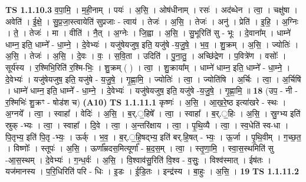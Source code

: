 \documentclass[17pt]{extarticle}
\begin{document}
                  \newline
                                \textbf{ TS 1.1.10.3} \newline
                  व॒पा॒मि॒ । म॒ही॒नाम् । पयः॑ । अ॒सि॒ । ओष॑धीनाम् । रसः॑ । अद॑ब्धेन । त्वा॒ । चक्षु॑षा । अवेति॑ । ई॒क्षे॒ । सु॒प्र॒जा॒स्त्वायेति॑ सुप्रजाः - त्वाय॑ । तेजः॑ । अ॒सि॒ । तेजः॑ । अनु॑ । प्रेति॑ । इ॒हि॒ । अ॒ग्निः । ते॒ । तेजः॑ । मा । वीति॑ । नै॒त् । अ॒ग्नेः । जि॒ह्वा । अ॒सि॒ । सु॒भूरिति॑ सु - भूः । दे॒वाना᳚म् । धाम्ने॑ धाम्न॒ इति॒ धाम्ने᳚ - धा॒म्ने॒ । दे॒वेभ्यः॑ । यजु॑षेयजुष॒ इति॒ यजु॑षे -य॒जु॒षे॒ । भ॒व॒ । शु॒क्रम् । अ॒सि॒ । ज्योतिः॑ । अ॒सि॒ । तेजः॑ । अ॒सि॒ । दे॒वः । वः॒ । स॒वि॒ता । उदिति॑ । पु॒ना॒तु॒ । अच्छि॑द्रेण । प॒वित्रे॑ण । वसोः᳚ । सूर्य॑स्य । र॒श्मिभि॒रिति॑ र॒श्मि-भिः॒ । शु॒क्रम् ( ) । त्वा॒ । शु॒क्राया᳚म् । धाम्ने॑ धाम्न॒ इति॒ धाम्ने᳚ - धा॒म्ने॒ । दे॒वेभ्यः॑ । यजु॑षेयजुष॒ इति॒ यजु॑षे - य॒जु॒षे॒ । गृ॒ह्णा॒मि॒ । ज्योतिः॑ । त्वा॒ । ज्योति॑षि । अ॒र्चिः । त्वा॒ । अ॒र्चिषि॑ । धाम्ने॑ धाम्न॒ इति॒ धाम्ने᳚ - धा॒म्ने॒ । दे॒वेभ्यः॑ । यजु॑षेयजुष॒ इति॒ यजु॑षे -य॒जु॒षे॒ । गृ॒ह्णा॒मि॒ ॥ \textbf{  18} \newline
                  \newline
                      (उप॒ - नी - र॒श्मिभिः॑ शु॒क्रꣳ - षोड॑श च)  \textbf{(A10)} \newline \newline
                                \textbf{ TS 1.1.11.1} \newline
                  कृष्णः॑ । अ॒सि॒ । आ॒ख॒रे॒ष्ठ इत्या॑खरे - स्थः । अ॒ग्नये᳚ । त्वा॒ । स्वाहा᳚ । वेदिः॑ । अ॒सि॒ । ब॒र्.॒हिषे᳚ । त्वा॒ । स्वाहा᳚ । ब॒र्.॒हिः । अ॒सि॒ । स्रु॒ग्भ्य इति॑ स्रुक् -भ्यः । त्वा॒ । स्वाहा᳚ । दि॒वे । त्वा॒ । अ॒न्तरि॑क्षाय । त्वा॒ । पृ॒थि॒व्यै । त्वा॒ । स्व॒धेति॑ स्व-धा । पि॒तृभ्य॒ इति॑ पि॒तृ -भ्यः॒ । ऊर्क् । भ॒व॒ । ब॒र्.॒हि॒षद्भ्य॒ इति॑ बर्.हि॒षत् - भ्यः॒ । ऊ॒र्जा । पृ॒थि॒वीम् । ग॒च्छ॒त॒ । विष्णोः᳚ । स्तूपः॑ । अ॒सि॒ । ऊर्णा᳚म्रदस॒मित्यूर्णा᳚ - म्र॒द॒स॒म् । त्वा॒ । स्तृ॒णा॒मि॒ । स्वा॒स॒स्थमिति॑ सु -आ॒स॒स्थम् । दे॒वेभ्यः॑ । ग॒न्ध॒र्वः॑ । अ॒सि॒ । वि॒श्वाव॑सु॒रिति॑ वि॒श्व - व॒सुः॒ । विश्व॑स्मात् । ईष॑तः । यज॑मानस्य । प॒रि॒धिरिति॑ परि - धिः । इ॒डः । ई॒डि॒तः । इन्द्र॑स्य । बा॒हुः । अ॒सि॒ । \textbf{  19} \newline
                  \newline
                                \textbf{ TS 1.1.11.2} \newline
\end{document}
